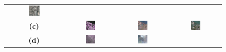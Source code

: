 \begin{figure}[!htbp]
\begin{tabular}{c *{3}{c}}
        \includegraphics[width=0.2\textwidth, height=0.2\textheight, keepaspectratio]{img/qualitative-20/sample_3/gt.png} \\
        \textbf{(c)} &
        \includegraphics[width=0.2\textwidth, height=0.2\textheight, keepaspectratio]{img/qualitative-20/sample_5/sar.png} &
        \includegraphics[width=0.2\textwidth, height=0.2\textheight, keepaspectratio]{img/qualitative-20/sample_5/gen.png} &
        \includegraphics[width=0.2\textwidth, height=0.2\textheight, keepaspectratio]{img/qualitative-20/sample_5/gt.png} \\
        \textbf{(d)} &
        \includegraphics[width=0.2\textwidth, height=0.2\textheight, keepaspectratio]{img/qualitative-20/sample_7/sar.png} &
        \includegraphics[width=0.2\textwidth, height=0.2\textheight, keepaspectratio]{img/qualitative-20/sample_7/gen.png} &

\end{tabular}
\end{figure}
